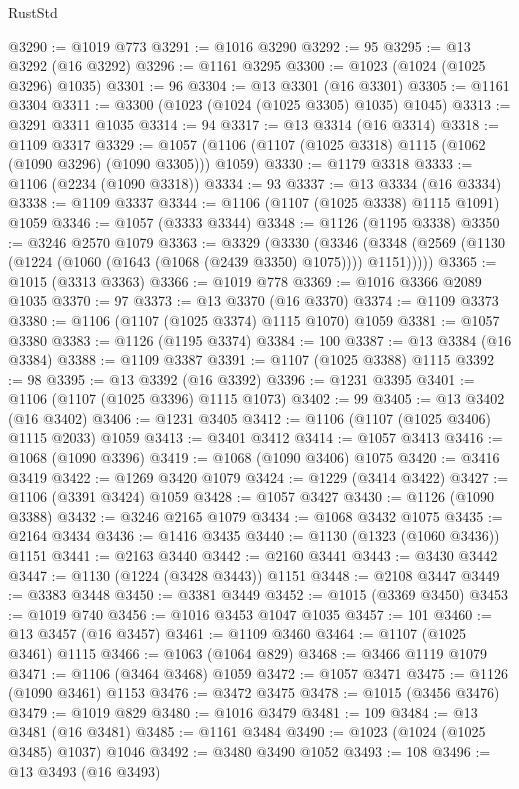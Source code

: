 \begin{lexlean}{RustStd}
\begin{coremodule}
@3290 := @1019 @773
@3291 := @1016 @3290
@3292 := 95
@3295 := @13 @3292 (@16 @3292)
@3296 := @1161 @3295
@3300 := @1023 (@1024 (@1025 @3296) @1035)
@3301 := 96
@3304 := @13 @3301 (@16 @3301)
@3305 := @1161 @3304
@3311 := @3300 (@1023 (@1024 (@1025 @3305) @1035) @1045)
@3313 := @3291 @3311 @1035
@3314 := 94
@3317 := @13 @3314 (@16 @3314)
@3318 := @1109 @3317
@3329 := @1057 (@1106 (@1107 (@1025 @3318) @1115 (@1062 (@1090 @3296) (@1090 @3305))) @1059)
@3330 := @1179 @3318
@3333 := @1106 (@2234 (@1090 @3318))
@3334 := 93
@3337 := @13 @3334 (@16 @3334)
@3338 := @1109 @3337
@3344 := @1106 (@1107 (@1025 @3338) @1115 @1091) @1059
@3346 := @1057 (@3333 @3344)
@3348 := @1126 (@1195 @3338)
@3350 := @3246 @2570 @1079
@3363 := @3329
    (@3330
      (@3346 (@3348 (@2569 (@1130 (@1224 (@1060 (@1643 (@1068 (@2439 @3350) @1075)))) @1151)))))
@3365 := @1015 (@3313 @3363)
@3366 := @1019 @778
@3369 := @1016 @3366 @2089 @1035
@3370 := 97
@3373 := @13 @3370 (@16 @3370)
@3374 := @1109 @3373
@3380 := @1106 (@1107 (@1025 @3374) @1115 @1070) @1059
@3381 := @1057 @3380
@3383 := @1126 (@1195 @3374)
@3384 := 100
@3387 := @13 @3384 (@16 @3384)
@3388 := @1109 @3387
@3391 := @1107 (@1025 @3388) @1115
@3392 := 98
@3395 := @13 @3392 (@16 @3392)
@3396 := @1231 @3395
@3401 := @1106 (@1107 (@1025 @3396) @1115 @1073)
@3402 := 99
@3405 := @13 @3402 (@16 @3402)
@3406 := @1231 @3405
@3412 := @1106 (@1107 (@1025 @3406) @1115 @2033) @1059
@3413 := @3401 @3412
@3414 := @1057 @3413
@3416 := @1068 (@1090 @3396)
@3419 := @1068 (@1090 @3406) @1075
@3420 := @3416 @3419
@3422 := @1269 @3420 @1079
@3424 := @1229 (@3414 @3422)
@3427 := @1106 (@3391 @3424) @1059
@3428 := @1057 @3427
@3430 := @1126 (@1090 @3388)
@3432 := @3246 @2165 @1079
@3434 := @1068 @3432 @1075
@3435 := @2164 @3434
@3436 := @1416 @3435
@3440 := @1130 (@1323 (@1060 @3436)) @1151
@3441 := @2163 @3440
@3442 := @2160 @3441
@3443 := @3430 @3442
@3447 := @1130 (@1224 (@3428 @3443)) @1151
@3448 := @2108 @3447
@3449 := @3383 @3448
@3450 := @3381 @3449
@3452 := @1015 (@3369 @3450)
@3453 := @1019 @740
@3456 := @1016 @3453 @1047 @1035
@3457 := 101
@3460 := @13 @3457 (@16 @3457)
@3461 := @1109 @3460
@3464 := @1107 (@1025 @3461) @1115
@3466 := @1063 (@1064 @829)
@3468 := @3466 @1119 @1079
@3471 := @1106 (@3464 @3468) @1059
@3472 := @1057 @3471
@3475 := @1126 (@1090 @3461) @1153
@3476 := @3472 @3475
@3478 := @1015 (@3456 @3476)
@3479 := @1019 @829
@3480 := @1016 @3479
@3481 := 109
@3484 := @13 @3481 (@16 @3481)
@3485 := @1161 @3484
@3490 := @1023 (@1024 (@1025 @3485) @1037) @1046
@3492 := @3480 @3490 @1052
@3493 := 108
@3496 := @13 @3493 (@16 @3493)

\end{coremodule}
\end{lexlean}
